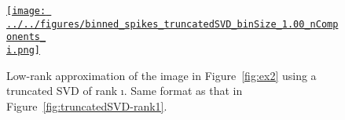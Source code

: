 \documentclass[12pt]{article}
\begin{document}
\begin{enumerate}
{\begin{figure}
\begin{center}
                        \href{http://www.gatsby.ucl.ac.uk/~rapela/neuroinformatics/2023/ws5/figures/binned_spikes_truncatedSVD_binSize_1.00_nComponents_\i.html}{\texttt{[image: ../../figures/binned\_spikes\_truncatedSVD\_binSize\_1.00\_nComponents\_\\i.png]}}

                        \caption{Low-rank approximation of the image in
                        Figure~\ref{fig:ex2} using a truncated SVD of rank
                        \i. Same format as that in Figure~\ref{fig:truncatedSVD-rank1}.
                        }

                        \label{fig:truncatedSVD-rank\i}

                    \end{center}
                \end{figure}
            }


\end{enumerate}
\end{document}
